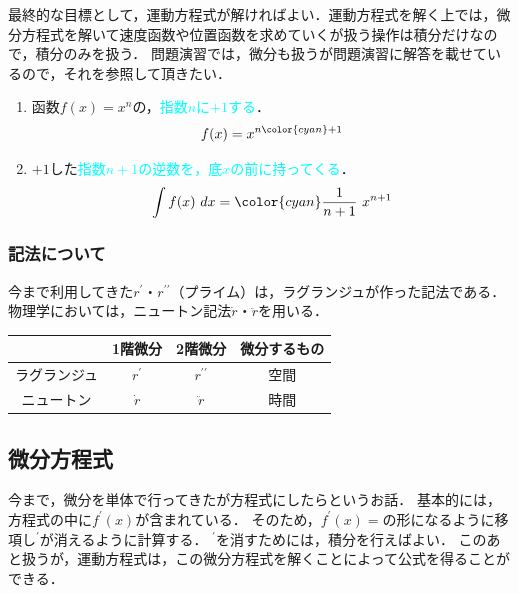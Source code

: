 \documentclass[a4paper,11pt]{ltjsarticle}
\begin{document}
最終的な目標として，運動方程式が解ければよい．運動方程式を解く上では，微分方程式を解いて速度函数や位置函数を求めていくが扱う操作は積分だけなので，積分のみを扱う．
問題演習では，微分も扱うが問題演習に解答を載せているので，それを参照して頂きたい．

\begin{enumerate}
  \item 函数$f(x)=x^{n}$の，\textcolor{cyan}{指数$n$に$+1$する}．
  \begin{equation}
    f(x)=x^{n{\color{cyan} +1}}
  \end{equation}
  \item $+1$した\textcolor{cyan}{指数$n+1$の逆数を，底$x$の前に持ってくる}．
  \begin{equation}
    \displaystyle{\int f(x)\ dx={\color{cyan} \dfrac{1}{n+1}}\ x^{n+1}}
  \end{equation}
\end{enumerate}

\subsubsection{記法について}

今まで利用してきた$r^{\prime}$・$r^{\prime \prime}$（プライム）は，ラグランジュが作った記法である．
物理学においては，ニュートン記法$\dot{r}$・$\ddot{r}$を用いる．


\begin{table}[hb]
  \centering
  \begin{tabular}{cccc}
    \hline
                  & 1階微分          & 2階微分              & 微分するもの \\
    \hline
      ラグランジュ & $r^{\prime}$     & $r^{\prime \prime}$ & 空間 \\
      ニュートン   & $\dot{r}$   & $\ddot{r}$     & 時間 \\
    \hline
  \end{tabular}
\end{table}

\clearpage

\subsection{微分方程式}

今まで，微分を単体で行ってきたが方程式にしたらというお話．
基本的には，方程式の中に$f^{\prime}(x)$が含まれている．
そのため，$f^{\prime}(x)=$の形になるように移項し$^\prime$が消えるように計算する．
$^\prime$を消すためには，積分を行えばよい．
このあと扱うが，運動方程式は，この微分方程式を解くことによって公式を得ることができる．
\end{document}
